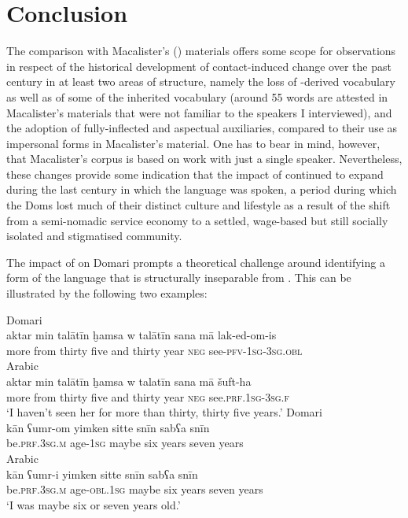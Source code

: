 \documentclass[output=paper]{langsci/langscibook}
\begin{document}
\section{Conclusion}

The comparison with Macalister's (\citeyear{Macalister1914}) materials offers some scope for observations in respect of the historical development of contact-induced change over the past century in at least two areas of structure, namely the loss of -derived vocabulary as well as of some of the inherited  vocabulary (around 55 words are attested in Macalister’s materials that were not familiar to the speakers I interviewed), and the adoption of fully-inflected  and aspectual auxiliaries, compared to their use as impersonal forms in Macalister’s material. One has to bear in mind, however, that Macalister’s corpus is based on work with just a single speaker. Nevertheless, these changes provide some indication that the impact of  continued to expand during the last century in which the language was spoken, a period during which the Doms lost much of their distinct culture and lifestyle as a result of the shift from a semi-nomadic service economy to a settled, wage-based but still socially isolated and stigmatised community. 

The impact of  on Domari prompts a theoretical challenge around identifying a form of the language that is structurally inseparable from . This can be illustrated by the following two examples:

\ea \label{aktar1}
\ea
{Domari}\\
\gll aktar min talātīn ḫamsa w talātīn sana mā lak-ed-om-is\\
     more from thirty five and thirty year \textsc{neg} see-\textsc{pfv-1sg-3sg.obl}\\ \label{aktar}
\ex
{Arabic}\\
\gll aktar min talātīn ḫamsa w talatīn sana mā šuft-ha\\
     more from thirty five and thirty year \textsc{neg} see.\textsc{prf.1sg-3sg.f}\\ \label{aktar2}
\glt ‘I haven’t seen her for more than thirty, thirty five years.’
\z
\ex  \label{umr1}
\ea
{Domari}\\
\gll kān ʕumr-om yimken sitte snīn sabʕa snīn\\
     be\textsc{.prf.3sg.m} age-\textsc{1sg} maybe six years seven years\\ \label{umr}
\ex
{Arabic}\\
\gll kān ʕumr-i yimken sitte snīn sabʕa snīn\\
     be\textsc{.prf.3sg.m} age-\textsc{obl.1sg} maybe six years seven years\\ \label{umr2}
\glt ‘I was maybe six or seven years old.’
\z
\z
\end{document}
